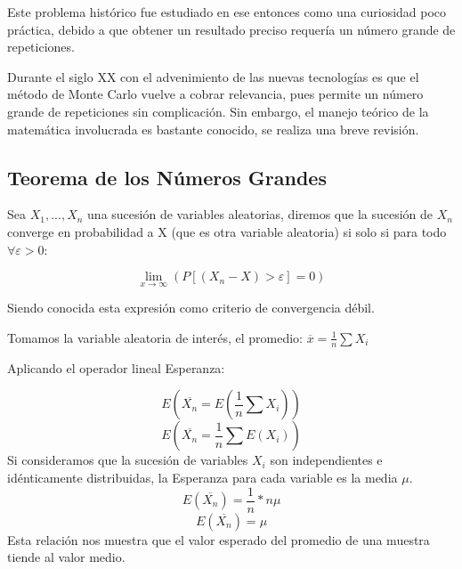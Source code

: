 \documentclass{rbf}
\begin{document}
Este problema histórico fue estudiado en ese entonces como una curiosidad poco práctica, debido a que obtener un resultado preciso requería un número grande de repeticiones. 

Durante el siglo XX con el advenimiento de las nuevas tecnologías es que el método de Monte Carlo vuelve a cobrar relevancia, pues permite un número grande de repeticiones sin complicación. Sin embargo, el manejo teórico de la matemática involucrada es bastante conocido, se realiza una breve revisión.

\subsection{Teorema de los Números Grandes}
Sea $X_1,..., X_n$ una sucesión de variables aleatorias, diremos que la sucesión de ${X_n}$ converge en probabilidad a X (que es otra variable aleatoria) si solo si para todo $\forall \varepsilon >0$:

\begin{equation}
    \lim_{x \to \infty}(P[(X_n - X)>\varepsilon]=0)
\end{equation}

Siendo conocida esta expresión como criterio de convergencia débil. 

Tomamos la variable aleatoria de interés, el promedio:
$\overline{x}=\frac{1}{n}\sum X_i$  

Aplicando el operador lineal Esperanza:

\begin{equation}
    E(\overline{X_n}=E(\frac{1}{n} \sum X_i))
\end{equation}
\begin{equation}
    E(\overline{X_n}=\frac{1}{n} \sum E(X_i))
\end{equation}
Si consideramos que la sucesión de variables $X_i$ son independientes e idénticamente distribuidas, la Esperanza para cada variable es la media $\mu$.
\begin{equation}
    E(\overline{X_n})=\frac{1}{n} *n\mu
\end{equation}
\begin{equation}
    E(\overline{X_n})=\mu
\end{equation}
Esta relación nos muestra que el valor esperado del promedio de una muestra tiende al valor medio.
\end{document}
